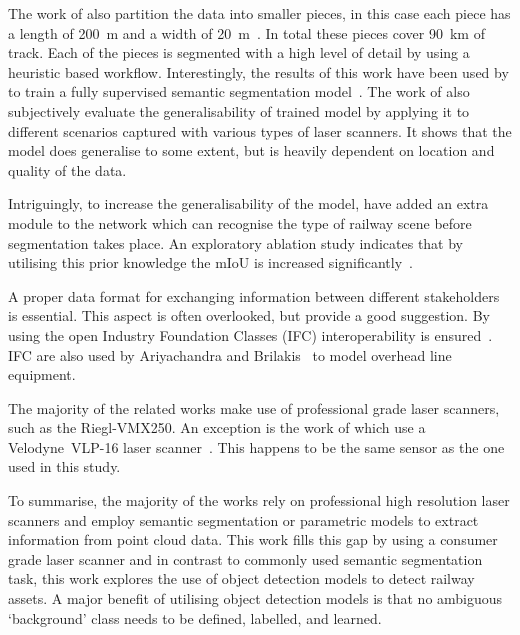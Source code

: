 The work of \citeauthor{lamas2021automatic} also partition the data into smaller pieces, in this case each piece has a length of 200~m and a width of 20~m~\cite{lamas2021automatic}. In total these pieces cover 90~km of track. Each of the pieces is segmented with a high level of detail by using a heuristic based workflow. Interestingly, the results of this work have been used by \citeauthor{grandio2022point} to train a fully supervised semantic segmentation model~\cite{grandio2022point}. The work of \citeauthor{grandio2022point} also subjectively evaluate the generalisability of trained model by applying it to different scenarios captured with various types of laser scanners. It shows that the model does generalise to some extent, but is heavily dependent on location and quality of the data.

Intriguingly, to increase the generalisability of the model, \citeauthor{WangZhiPeng23} have added an extra module to the network which can recognise the type of railway scene before segmentation takes place. An exploratory ablation study indicates that by utilising this prior knowledge the mIoU is increased significantly~\cite{WangZhiPeng23}.

A proper data format for exchanging information between different stakeholders is essential. This aspect is often overlooked, but \citeauthor{soilan2021fully} provide a good suggestion. By using the open Industry Foundation Classes (IFC) interoperability is ensured~\cite{soilan2021fully}. IFC are also used by Ariyachandra and Brilakis~\cite{ariyachandra2020digital} to model overhead line equipment.

The majority of the related works make use of professional grade laser scanners, such as the Riegl-VMX250. An exception is the work of \citeauthor{zou2019efficient} which use a Velodyne~VLP-16 laser scanner~\cite{zou2019efficient}. This happens to be the same sensor as the one used in this study.

To summarise, the majority of the works rely on professional high resolution laser scanners and employ semantic segmentation or parametric models to extract information from point cloud data. This work fills this gap by using a consumer grade laser scanner and in contrast to commonly used semantic segmentation task, this work explores the use of object detection models to detect railway assets. A major benefit of utilising object detection models is that no ambiguous `background' class needs to be defined, labelled, and learned.

